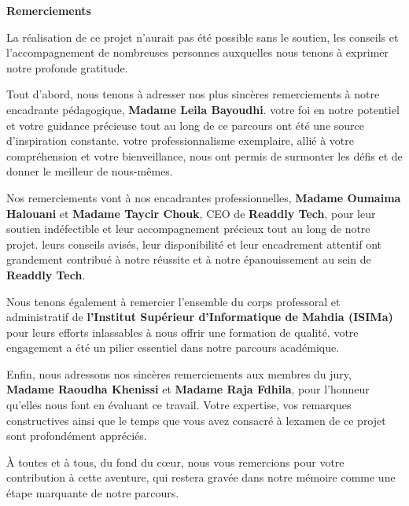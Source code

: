 \clearpage
\thispagestyle{empty}

\begin{center}
    
    {\Huge \bfseries Remerciements}
\end{center}

\vspace{1cm}
La réalisation de ce projet n’aurait pas été possible sans le soutien, les conseils et l’accompagnement de nombreuses personnes auxquelles nous tenons à exprimer notre profonde gratitude.

\vspace{0.8cm}
Tout d’abord, nous tenons à adresser nos plus sincères remerciements à notre encadrante pédagogique, \textbf{Madame Leila Bayoudhi}. votre foi en notre potentiel et votre guidance précieuse tout au long de ce parcours ont été une source d’inspiration constante. votre professionnalisme exemplaire, allié à votre compréhension et votre bienveillance, nous ont permis de surmonter les défis et de donner le meilleur de nous-mêmes.

\vspace{0.8cm}
Nos remerciements vont à nos encadrantes professionnelles, \textbf{Madame Oumaima Halouani} et \textbf{Madame Taycir Chouk}, CEO de \textbf{Readdly Tech}, pour leur soutien indéfectible et leur accompagnement précieux tout au long de notre projet. leurs conseils avisés, leur disponibilité et leur encadrement attentif ont grandement contribué à notre réussite et à notre épanouissement au sein de \textbf{Readdly Tech}.

\vspace{0.8cm}
Nous tenons également à remercier l’ensemble du corps professoral et administratif de   
\textbf{l’Institut Supérieur d’Informatique de Mahdia (ISIMa)} pour leurs efforts inlassables à nous offrir une formation de qualité. votre engagement a été un pilier essentiel dans notre parcours académique.

\vspace{0.8cm}
Enfin, nous adressons nos sincères remerciements aux membres du jury, \textbf{Madame Raoudha Khenissi} et \textbf{Madame Raja Fdhila}, pour l’honneur qu’elles nous font en évaluant ce travail. Votre expertise, vos remarques constructives ainsi que le temps que vous avez consacré à lexamen de ce projet sont profondément appréciés.

\vspace{0.8cm}
À toutes et à tous, du fond du cœur, nous vous remercions pour votre contribution à cette aventure, qui restera gravée dans notre mémoire comme une étape marquante de notre parcours.
